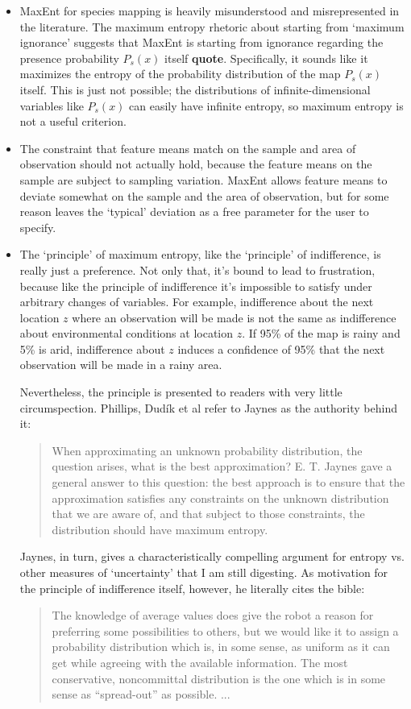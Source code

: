 \begin{itemize}
    \item MaxEnt for species mapping is heavily misunderstood and misrepresented in the literature. The maximum entropy rhetoric about starting from `maximum ignorance' suggests that MaxEnt is starting from ignorance regarding the presence probability $P_s(x)$ itself \textbf{quote}. Specifically, it sounds like it maximizes the entropy of the probability distribution of the map $P_s(x)$ itself. This is just not possible; the distributions of infinite-dimensional variables like $P_s(x)$ can easily have infinite entropy, so maximum entropy is not a useful criterion.
    \item The constraint that feature means match on the sample and area of observation should not actually hold, because the feature means on the sample are subject to sampling variation. MaxEnt allows feature means to deviate somewhat on the sample and the area of observation, but for some reason leaves the `typical' deviation as a free parameter for the user to specify.
    \item The `principle' of maximum entropy, like the `principle' of indifference, is really just a preference. Not only that, it's bound to lead to frustration, because like the principle of indifference it's impossible to satisfy under arbitrary changes of variables. For example, indifference about the next location $z$ where an observation will be made is not the same as indifference about environmental conditions at location $z$. If 95\% of the map is rainy and 5\% is arid, indifference about $z$ induces a confidence of 95\% that the next observation will be made in a rainy area.
    
    Nevertheless, the principle is presented to readers with very little circumspection. Phillips, Dud\'ik et al \cite{Phillips:2004p11403,Phillips:2006p11404,Phillips:2008p12219} refer to Jaynes \cite{Jaynes:ch11} as the authority behind it:
    \begin{quote}
        When approximating an unknown probability distribution, the question arises, what is the best approximation? E. T. Jaynes gave a general answer to this question: the best approach is to ensure that the approximation satisfies any constraints on the unknown distribution that we are aware of, and that subject to those constraints, the distribution should have maximum entropy.
    \end{quote} 
Jaynes, in turn, gives a characteristically compelling argument for entropy vs. other measures of `uncertainty' that I am still digesting. As motivation for the principle of indifference itself, however, he literally cites the bible:
\begin{quote}
    The knowledge of average values does give the robot a reason for preferring some possibilities to others, but we would like it to assign a probability distribution which is, in some sense, as uniform as it can get while agreeing with the available information. The most conservative, noncommittal distribution is the one which is in some sense as ``spread-out'' as possible. ...
    

\end{quote}
\end{itemize}
